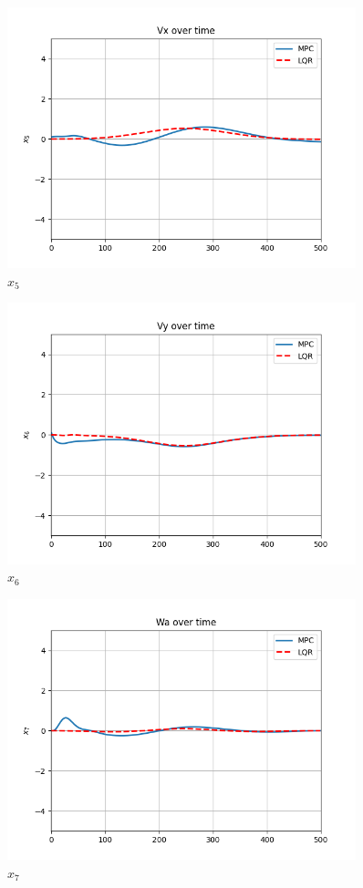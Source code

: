 \begin{figure}[H]
\centering
\includegraphics[width=0.9\textwidth]{pictures/mpc5.png}
\caption{$x_5$}
\label{fig:mpc5}
\end{figure}

\begin{figure}[H]
\centering
\includegraphics[width=0.9\textwidth]{pictures/mpc6.png}
\caption{$x_6$}
\label{fig:mpc6}
\end{figure}

\begin{figure}[H]
\centering
\includegraphics[width=0.9\textwidth]{pictures/mpc7.png}
\caption{$x_7$}
\label{fig:mpc7}
\end{figure}

